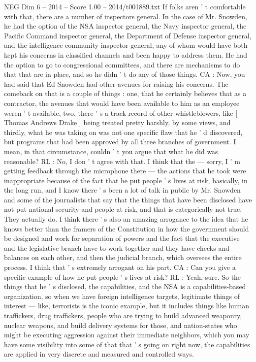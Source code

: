 \begin{textsample}{NEG Dim 6 – 2014 – Score 1.00 – 2014/t001889.txt}
If folks aren ' t comfortable with that, there are a number of inspectors general.
In the case of Mr.
Snowden, he had the option of the NSA inspector general, the Navy inspector general, the Pacific Command inspector general, the Department of Defense inspector general, and the intelligence community inspector general, any of whom would have both kept his concerns in classified channels and been happy to address them.
He had the option to go to congressional committees, and there are mechanisms to do that that are in place, and so he didn ' t do any of those things.
CA : Now, you had said that Ed Snowden had other avenues for raising his concerns.
The comeback on that is a couple of things : one, that he certainly believes that as a contractor, the avenues that would have been available to him as an employee weren ' t available, two, there ' s a track record of other whistleblowers, like [ Thomas Andrews Drake ] being treated pretty harshly, by some views, and thirdly, what he was taking on was not one specific flaw that he ' d discovered, but programs that had been approved by all three branches of government.
I mean, in that circumstance, couldn ' t you argue that what he did was reasonable?
RL : No, I don ' t agree with that.
I think that the — sorry, I ' m getting feedback through the microphone there — the actions that he took were inappropriate because of the fact that he put people ' s lives at risk, basically, in the long run, and I know there ' s been a lot of talk in public by Mr.
Snowden and some of the journalists that say that the things that have been disclosed have not put national security and people at risk, and that is categorically not true.
They actually do.
I think there ' s also an amazing arrogance to the idea that he knows better than the framers of the Constitution in how the government should be designed and work for separation of powers and the fact that the executive and the legislative branch have to work together and they have checks and balances on each other, and then the judicial branch, which oversees the entire process.
I think that ' s extremely arrogant on his part.
CA : Can you give a specific example of how he put people ' s lives at risk?
RL : Yeah, sure.
So the things that he ' s disclosed, the capabilities, and the NSA is a capabilities-based organization, so when we have foreign intelligence targets, legitimate things of interest — like, terrorists is the iconic example, but it includes things like human traffickers, drug traffickers, people who are trying to build advanced weaponry, nuclear weapons, and build delivery systems for those, and nation-states who might be executing aggression against their immediate neighbors, which you may have some visibility into some of that that ' s going on right now, the capabilities are applied in very discrete and measured and controlled ways.

\end{textsample}
